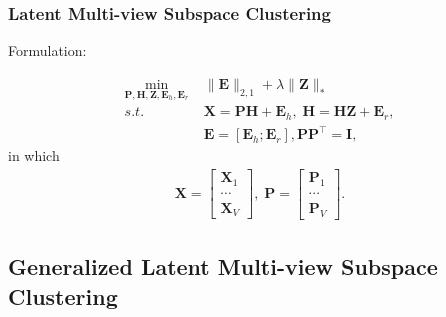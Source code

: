 \documentclass[notheorems, aspectratio=54]{beamer}
\begin{document}
\begin{frame} \frametitle{Latent Multi-view Subspace Clustering}

Formulation:

\begin{equation}
\begin{split}
  \min_{\mathbf{P}, \mathbf{H}, \mathbf{Z}, \mathbf{E}_h, \mathbf{E}_r}\; & \|\mathbf{E}\|_{2,1} + \lambda\|\mathbf{Z}\|_* \\
  s.t.\; & \mathbf{X} = \mathbf{P}\mathbf{H} + \mathbf{E}_h,\; \mathbf{H} = \mathbf{H}\mathbf{Z} + \mathbf{E}_r, \\
  & \mathbf{E} = [\mathbf{E}_h;\mathbf{E}_r], \mathbf{P}\mathbf{P}^\top = \mathbf{I}, 
\end{split}
\end{equation}
in which
\begin{equation}
\begin{split}
  \mathbf{X} = \begin{bmatrix} \mathbf{X}_1 \\ \cdots \\ \mathbf{X}_V \end{bmatrix},\; \mathbf{P} = \begin{bmatrix} \mathbf{P}_1 \\ \cdots \\ \mathbf{P}_V \end{bmatrix}. 
\end{split}
\end{equation}

\end{frame}


\subsection{Generalized Latent Multi-view Subspace Clustering}
\end{document}
